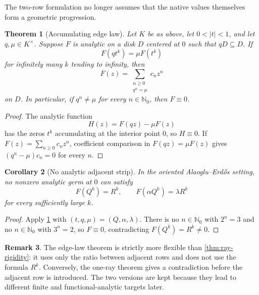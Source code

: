 \documentclass[11pt,oneside]{article}
\newtheorem{theorem}{Theorem}[section]
\newtheorem{corollary}[theorem]{Corollary}
\theoremstyle{definition}
\newtheorem{remark}[theorem]{Remark}
\newcommand{\Nzero}{\mathbb N_0}
\newcommand{\AEconj}{Alaoglu--Erd\H{o}s}
\begin{document}
The two-row formulation no longer assumes that the native values themselves form a geometric
progression.

\begin{theorem}[Accumulating edge law]\label{thm:edge-law}
Let $K$ be as above, let $0<|t|<1$, and let $q,\mu\in K^\times$.  Suppose $F$ is analytic on
a disk $D$ centered at $0$ such that $qD\subseteq D$.  If
\begin{equation}\label{eq:edge-samples}
 F(qt^k)=\mu F(t^k)
\end{equation}
for infinitely many $k$ tending to infinity, then
\begin{equation}\label{eq:edge-spectrum}
 F(z)=\sum_{\substack{n\ge0\\q^n=\mu}}c_nz^n
\end{equation}
on $D$.  In particular, if $q^n\ne\mu$ for every $n\in\Nzero$, then $F\equiv0$.
\end{theorem}

\begin{proof}
The analytic function
\[
 H(z)=F(qz)-\mu F(z)
\]
has the zeros $t^k$ accumulating at the interior point $0$, so $H\equiv0$.  If
$F(z)=\sum_{n\ge0}c_nz^n$, coefficient comparison in $F(qz)=\mu F(z)$ gives
$(q^n-\mu)c_n=0$ for every $n$.
\end{proof}

\begin{corollary}[No analytic adjacent strip]\label{cor:no-analytic-strip}
In the oriented \AEconj{} setting, no nonzero analytic germ at $0$ can satisfy
\begin{equation}\label{eq:two-row-data}
 F(Q^k)=R^k,
 \qquad
 F(\alpha Q^k)=\lambda R^k
\end{equation}
for every sufficiently large $k$.
\end{corollary}

\begin{proof}
Apply \cref{thm:edge-law} with $(t,q,\mu)=(Q,\alpha,\lambda)$.  There is no
$n\in\Nzero$ with $2^n=3$ and no $n\in\Nzero$ with $3^n=2$, so $F\equiv0$, contradicting
$F(Q^k)=R^k\ne0$.
\end{proof}

\begin{remark}
The edge-law theorem is strictly more flexible than \cref{thm:ray-rigidity}: it uses only the
ratio between adjacent rows and does not use the formula $R^k$.  Conversely, the one-ray
theorem gives a contradiction before the adjacent row is introduced.  The two versions are
kept because they lead to different finite and functional-analytic targets later.
\end{remark}
\end{document}
